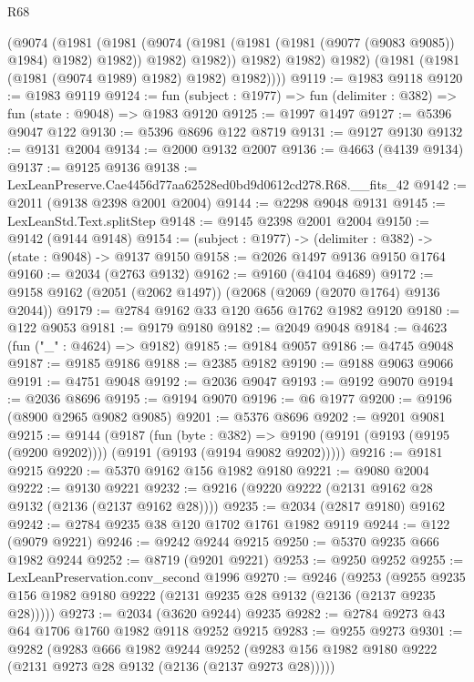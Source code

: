 \begin{lexlean}{R68}
\begin{coremodule}
                (@9074
                  (@1981
                    (@1981
                      (@9074 (@1981 (@1981 (@1981 (@9077 (@9083 @9085)) @1984) @1982) @1982))
                      @1982)
                    @1982))
                @1982)
              @1982)
            @1982)
          (@1981 (@1981 (@1981 (@9074 @1989) @1982) @1982) @1982))))
@9119 := @1983 @9118
@9120 := @1983 @9119
@9124 := fun (subject : @1977) => fun (delimiter : @382) => fun (state : @9048) => @1983 @9120
@9125 := @1997 @1497
@9127 := @5396 @9047 @122
@9130 := @5396 @8696 @122 @8719
@9131 := @9127 @9130
@9132 := @9131 @2004
@9134 := @2000 @9132 @2007
@9136 := @4663 (@4139 @9134)
@9137 := @9125 @9136
@9138 := LexLeanPreserve.Cae4456d77aa62528ed0bd9d0612cd278.R68.__fits_42
@9142 := @2011 (@9138 @2398 @2001 @2004)
@9144 := @2298 @9048 @9131
@9145 := LexLeanStd.Text.splitStep
@9148 := @9145 @2398 @2001 @2004
@9150 := @9142 (@9144 @9148)
@9154 := (subject : @1977) -> (delimiter : @382) -> (state : @9048) -> @9137 @9150
@9158 := @2026 @1497 @9136 @9150 @1764
@9160 := @2034 (@2763 @9132)
@9162 := @9160 (@4104 @4689)
@9172 := @9158 @9162 (@2051 (@2062 @1497)) (@2068 (@2069 (@2070 @1764) @9136 @2044))
@9179 := @2784 @9162 @33 @120 @656 @1762 @1982 @9120
@9180 := @122 @9053
@9181 := @9179 @9180
@9182 := @2049 @9048
@9184 := @4623 (fun ("_" : @4624) => @9182)
@9185 := @9184 @9057
@9186 := @4745 @9048
@9187 := @9185 @9186
@9188 := @2385 @9182
@9190 := @9188 @9063 @9066
@9191 := @4751 @9048
@9192 := @2036 @9047
@9193 := @9192 @9070
@9194 := @2036 @8696
@9195 := @9194 @9070
@9196 := @6 @1977
@9200 := @9196 (@8900 @2965 @9082 @9085)
@9201 := @5376 @8696
@9202 := @9201 @9081
@9215 := @9144
    (@9187
      (fun (byte : @382) =>
      @9190 (@9191 (@9193 (@9195 (@9200 @9202)))) (@9191 (@9193 (@9194 @9082 @9202)))))
@9216 := @9181 @9215
@9220 := @5370 @9162 @156 @1982 @9180
@9221 := @9080 @2004
@9222 := @9130 @9221
@9232 := @9216 (@9220 @9222 (@2131 @9162 @28 @9132 (@2136 (@2137 @9162 @28))))
@9235 := @2034 (@2817 @9180) @9162
@9242 := @2784 @9235 @38 @120 @1702 @1761 @1982 @9119
@9244 := @122 (@9079 @9221)
@9246 := @9242 @9244 @9215
@9250 := @5370 @9235 @666 @1982 @9244
@9252 := @8719 (@9201 @9221)
@9253 := @9250 @9252
@9255 := LexLeanPreservation.conv_second @1996
@9270 := @9246
    (@9253 (@9255 @9235 @156 @1982 @9180 @9222 (@2131 @9235 @28 @9132 (@2136 (@2137 @9235 @28)))))
@9273 := @2034 (@3620 @9244) @9235
@9282 := @2784 @9273 @43 @64 @1706 @1760 @1982 @9118 @9252 @9215
@9283 := @9255 @9273
@9301 := @9282
    (@9283
      @666
      @1982
      @9244
      @9252
      (@9283 @156 @1982 @9180 @9222 (@2131 @9273 @28 @9132 (@2136 (@2137 @9273 @28)))))

\end{coremodule}
\end{lexlean}
